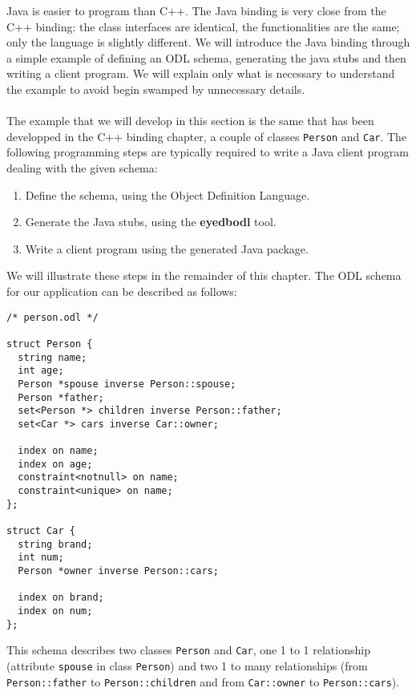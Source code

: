 \item Java is easier to program than C++.
\ei
The Java binding is very close from the C++ binding: the
class interfaces are identical, the functionalities
are the same; only the language is slightly different.
We will introduce the Java binding through a simple example of
defining an ODL schema, generating the java stubs and then writing
a client program.
We will explain only what is necessary to understand the example
to avoid begin swamped by unnecessary details.
\\
\\
The example that we will develop in this section is the same that
has been developped in the C++ binding chapter, a couple of classes
\texttt{Person} and \texttt{Car}.
The following programming steps are typically required to write a Java
client program dealing with the given schema:
\begin{enumerate}
\item Define the schema, using the \eyedb Object Definition Language.
\item Generate the Java stubs, using the {\bf eyedbodl} tool.
\item Write a client program using the generated Java package.
\end{enumerate}
We will illustrate these steps in the remainder of this chapter.
The ODL schema for our application can be described as follows:

{\verbsize \begin{verbatim}
/* person.odl */

struct Person {
  string name;
  int age;
  Person *spouse inverse Person::spouse;
  Person *father;
  set<Person *> children inverse Person::father;
  set<Car *> cars inverse Car::owner;

  index on name;
  index on age;
  constraint<notnull> on name;
  constraint<unique> on name;
};

struct Car {
  string brand;
  int num;
  Person *owner inverse Person::cars;

  index on brand;
  index on num;
};
\end{verbatim}
}
This schema describes two classes \texttt{Person} and \texttt{Car}, one 1 to 1
relationship (attribute \texttt{spouse} in class \texttt{Person}) and two 1 to many
relationships (from \texttt{Person::father} to \texttt{Person::children}
and from \texttt{Car::owner} to \texttt{Person::cars}).

